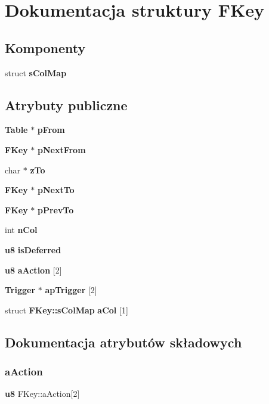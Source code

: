 \section{Dokumentacja struktury F\+Key}
\label{struct_f_key}
\subsection*{Komponenty}
\begin{DoxyCompactItemize}
\item 
struct \textbf{ s\+Col\+Map}
\end{DoxyCompactItemize}
\subsection*{Atrybuty publiczne}
\begin{DoxyCompactItemize}
\item 
\textbf{ Table} $\ast$ \textbf{ p\+From}
\item 
\textbf{ F\+Key} $\ast$ \textbf{ p\+Next\+From}
\item 
char $\ast$ \textbf{ z\+To}
\item 
\textbf{ F\+Key} $\ast$ \textbf{ p\+Next\+To}
\item 
\textbf{ F\+Key} $\ast$ \textbf{ p\+Prev\+To}
\item 
int \textbf{ n\+Col}
\item 
\textbf{ u8} \textbf{ is\+Deferred}
\item 
\textbf{ u8} \textbf{ a\+Action} [2]
\item 
\textbf{ Trigger} $\ast$ \textbf{ ap\+Trigger} [2]
\item 
struct \textbf{ F\+Key\+::s\+Col\+Map} \textbf{ a\+Col} [1]
\end{DoxyCompactItemize}


\subsection{Dokumentacja atrybutów składowych}
\mbox{\label{struct_f_key_a68a08f58294bf845e9c77d785499d222}} 
\subsubsection{aAction}
{\footnotesize\ttfamily \textbf{ u8} F\+Key\+::a\+Action[2]}

\mbox{\label{struct_f_key_a5b230bc6c10a67f432ed7d5ebc92bcd2}} 
